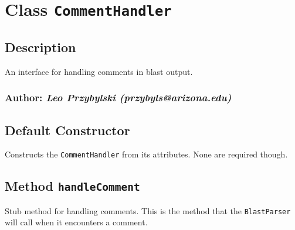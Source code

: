
\section{Class \texttt{CommentHandler}\label{Class_CommentHandler}}
\subsection*{Description\label{Description}}


An interface for handling comments in blast output.

\subsubsection*{Author: \textit{Leo Przybylski (przybyls@arizona.edu)}\label{Author:_Leo_Przybylski_przybyls_arizona_edu_}}
\subsection*{Default Constructor\label{Default_Constructor}}


Constructs the \texttt{CommentHandler} from its attributes. None are required though.

\subsection*{Method \texttt{handleComment}\label{Method_handleComment}}


Stub method for handling comments. This is the method that the \texttt{BlastParser} will call
when it encounters a comment.
